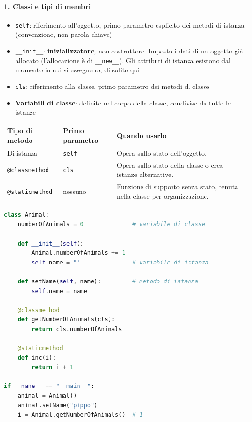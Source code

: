 \documentclass[12pt]{extarticle}
\begin{document}
\paragraph{1. Classi e tipi di membri}
\begin{itemize}
    \item \texttt{self}: riferimento all'oggetto, primo parametro esplicito dei metodi di istanza (convenzione, non parola chiave)
    \item \texttt{\_\_init\_\_}: \textbf{inizializzatore}, non costruttore. Imposta i dati di un oggetto già allocato (l'allocazione è di \texttt{\_\_new\_\_}). Gli attributi di istanza esistono dal momento in cui si assegnano, di solito qui
    \item \texttt{cls}: riferimento alla classe, primo parametro dei metodi di classe
    \item \textbf{Variabili di classe}: definite nel corpo della classe, condivise da tutte le istanze
\end{itemize}
\begin{center}
\small
\begin{tabular}{p{3.6cm}p{4.2cm}p{6.0cm}}
    \toprule
    \textbf{Tipo di metodo} & \textbf{Primo parametro} & \textbf{Quando usarlo} \\
    \midrule
    Di istanza & \texttt{self} & Opera sullo stato dell'oggetto. \\
    \addlinespace
    \texttt{@classmethod} & \texttt{cls} & Opera sullo stato della classe o crea istanze alternative. \\
    \addlinespace
    \texttt{@staticmethod} & nessuno & Funzione di supporto senza stato, tenuta nella classe per organizzazione. \\
    \bottomrule
\end{tabular}
\end{center}

\begin{lstlisting}[language=Python]
class Animal:
    numberOfAnimals = 0              # variabile di classe

    def __init__(self):
        Animal.numberOfAnimals += 1
        self.name = ""               # variabile di istanza

    def setName(self, name):         # metodo di istanza
        self.name = name

    @classmethod
    def getNumberOfAnimals(cls):
        return cls.numberOfAnimals

    @staticmethod
    def inc(i):
        return i + 1

if __name__ == "__main__":
    animal = Animal()
    animal.setName("pippo")
    i = Animal.getNumberOfAnimals()  # 1
\end{lstlisting}
\end{document}
